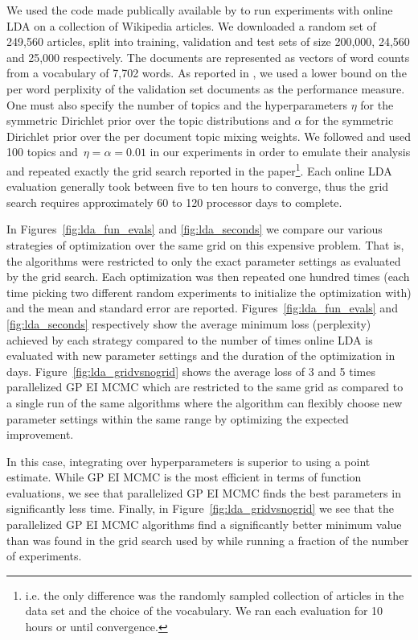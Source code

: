\documentclass[aos,preprint]{imsart}
\begin{document}
We used the code made publically available by \citet{Hoffman2010} to
run experiments with online LDA on a collection of Wikipedia
articles. We downloaded a random set of 249,560 articles, split into
training, validation and test sets of size 200,000, 24,560 and 25,000
respectively. The documents are represented as vectors of word counts
from a vocabulary of 7,702 words. As reported in \citet{Hoffman2010},
we used a lower bound on the per word perplixity of the validation set
documents as the performance measure. One must also specify the number
of topics and the hyperparameters $\eta$ for the symmetric Dirichlet
prior over the topic distributions and $\alpha$ for the symmetric
Dirichlet prior over the per document topic mixing weights. We
followed \citet{Hoffman2010} and used 100 topics and~${\eta = \alpha =
0.01}$ in our experiments in order to emulate their analysis and
repeated exactly the grid search reported in the
paper\footnote{i.e. the only difference was the randomly sampled
  collection of articles in the data set and the choice of the
  vocabulary. We ran each evaluation for 10 hours or until
  convergence.}. Each online LDA evaluation generally took between
five to ten hours to converge, thus the grid search requires
approximately 60 to 120 processor days to complete.

In Figures~\ref{fig:lda_fun_evals} and \ref{fig:lda_seconds} we
compare our various strategies of optimization over the same grid on
this expensive problem. That is, the algorithms were restricted to
only the exact parameter settings as evaluated by the grid search.
Each optimization was then repeated one hundred times (each time
picking two different random experiments to initialize the
optimization with) and the mean and standard error are
reported. Figures~\ref{fig:lda_fun_evals} and \ref{fig:lda_seconds}
respectively show the average minimum loss (perplexity) achieved by
each strategy compared to the number of times online LDA is evaluated
with new parameter settings and the duration of the optimization in
days.  Figure~\ref{fig:lda_gridvsnogrid} shows the average loss of 3
and 5 times parallelized GP EI MCMC which are restricted to the same
grid as compared to a single run of the same algorithms where the
algorithm can flexibly choose new parameter settings within the same
range by optimizing the expected improvement.

In this case, integrating over hyperparameters is superior to using a point
estimate.  While GP EI MCMC is the most efficient in
terms of function evaluations, we see that parallelized GP EI MCMC
finds the best parameters in significantly less time.  Finally, in
Figure~\ref{fig:lda_gridvsnogrid} we see that the parallelized GP EI
MCMC algorithms find a significantly better minimum value than was
found in the grid search used by \citet{Hoffman2010} while running
a fraction of the number of experiments.
\end{document}
